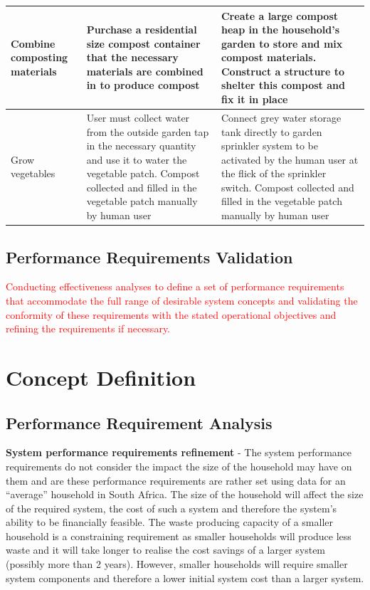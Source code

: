 \documentclass[a4paper,11pt,fleqn]{report}
\begin{document}
{\begin{table}[h!]
\begin{center}
\begin{tabular}{p{3.5cm}|p{6cm}|p{6cm}}
    \hline
     Combine composting materials & Purchase a residential size compost container that the necessary materials are combined in to produce compost & Create a large compost heap in the household's garden to store and mix compost materials. Construct a structure to shelter this compost and fix it in place\\
    \hline
     Grow vegetables & User must collect water from the outside garden tap in the necessary quantity and use it to water the vegetable patch. Compost collected and filled in the vegetable patch manually by human user & Connect grey water storage tank directly to garden sprinkler system to be activated by the human user at the flick of the sprinkler switch. Compost collected and filled in the vegetable patch manually by human user\\
    \hline
    \bottomrule
\end{tabular}
\end{center}
\end{table}
%
	
\subsection{Performance Requirements Validation}
\textcolor{red}{Conducting effectiveness analyses to define a set of performance requirements that accommodate the full range of desirable system concepts and validating the conformity of these requirements with the stated operational objectives and refining the requirements if necessary.}

\section{Concept Definition}
\subsection{Performance Requirement Analysis}
\textbf{System performance requirements refinement} - The system performance requirements do not consider the impact the size of the household may have on them and are these performance requirements are rather set using data for an “average” household in South Africa. The size of the household will affect the size of the required system, the cost of such a system and therefore the system’s ability to be financially feasible. The waste producing capacity of a smaller household is a constraining requirement as smaller households will produce less waste and it will take longer to realise the cost savings of a larger system (possibly more than 2 years). However, smaller households will require smaller system components and therefore a lower initial system cost than a larger system.

}
\end{document}
